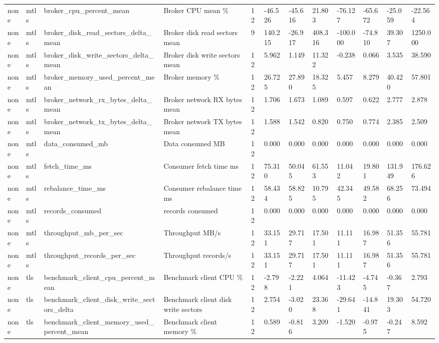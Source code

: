 \begin{longtable}{llllllllllll}
none & mtls & broker\_cpu\_percent\_mean & Broker CPU mean \% & 12 & -46.526 & -45.616 & 21.803 & -76.127 & -65.672 & -25.059 & -22.564 \\
none & mtls & broker\_disk\_read\_sectors\_delta\_mean & Broker disk read sectors mean & 9 & 140.215 & -26.917 & 408.316 & -100.000 & -74.810 & 39.307 & 1250.000 \\
none & mtls & broker\_disk\_write\_sectors\_delta\_mean & Broker disk write sectors mean & 12 & 5.962 & 1.149 & 11.322 & -0.238 & 0.066 & 3.535 & 38.590 \\
none & mtls & broker\_memory\_used\_percent\_mean & Broker memory \% & 12 & 26.725 & 27.890 & 18.325 & 5.457 & 8.279 & 40.420 & 57.801 \\
none & mtls & broker\_network\_rx\_bytes\_delta\_mean & Broker network RX bytes mean & 12 & 1.706 & 1.673 & 1.089 & 0.597 & 0.622 & 2.777 & 2.878 \\
none & mtls & broker\_network\_tx\_bytes\_delta\_mean & Broker network TX bytes mean & 12 & 1.588 & 1.542 & 0.820 & 0.750 & 0.774 & 2.385 & 2.509 \\
none & mtls & data\_consumed\_mb & Data consumed MB & 12 & 0.000 & 0.000 & 0.000 & 0.000 & 0.000 & 0.000 & 0.000 \\
none & mtls & fetch\_time\_ms & Consumer fetch time ms & 12 & 75.310 & 50.045 & 61.553 & 11.042 & 19.801 & 131.949 & 176.626 \\
none & mtls & rebalance\_time\_ms & Consumer rebalance time ms & 12 & 58.434 & 58.825 & 10.795 & 42.345 & 49.582 & 68.256 & 73.494 \\
none & mtls & records\_consumed & records consumed & 12 & 0.000 & 0.000 & 0.000 & 0.000 & 0.000 & 0.000 & 0.000 \\
none & mtls & throughput\_mb\_per\_sec & Throughput MB/s & 12 & 33.151 & 29.717 & 17.501 & 11.111 & 16.987 & 51.356 & 55.781 \\
none & mtls & throughput\_records\_per\_sec & Throughput records/s & 12 & 33.151 & 29.717 & 17.501 & 11.111 & 16.987 & 51.356 & 55.781 \\
none & tls & benchmark\_client\_cpu\_percent\_mean & Benchmark client CPU \% & 12 & -2.798 & -2.221 & 4.064 & -11.423 & -4.745 & -0.367 & 2.793 \\
none & tls & benchmark\_client\_disk\_write\_sectors\_delta & Benchmark client disk write sectors & 12 & 2.754 & -3.020 & 23.368 & -29.641 & -14.841 & 19.303 & 54.720 \\
none & tls & benchmark\_client\_memory\_used\_percent\_mean & Benchmark client memory \% & 12 & 0.589 & -0.816 & 3.209 & -1.520 & -0.975 & -0.247 & 8.592 \\

\end{longtable}
